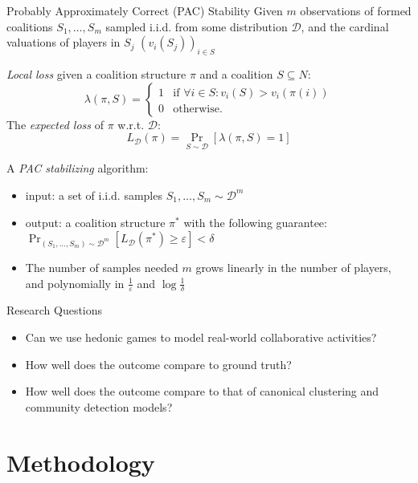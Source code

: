 \documentclass[xcolor=dvipsnames]{beamer}
\renewcommand{\cal}[1]{\mathcal{#1}}
\newcommand{\eps}{\varepsilon}
\begin{document}
\begin{frame}{Probably Approximately Correct (PAC) Stability}
  \small
  Given $m$ observations of formed coalitions $S_1,\dots,S_m$ sampled i.i.d. from some distribution $\cal D$, and the cardinal valuations of players in $S_j$ $(v_i(S_j))_{i \in S}$

  \textit{Local loss} given a coalition structure $\pi$ and a coalition $S \subseteq N$:
$$\lambda(\pi,S) = \begin{cases}1 & \mbox{if }\forall i \in S: v_i(S) > v_i(\pi(i))\\0&\mbox{otherwise.}\end{cases}$$
  The \textit{expected loss} of $\pi$ w.r.t. $\cal D$:
$$L_{\cal D}(\pi) = \Pr_{S \sim \cal D}\left[\lambda(\pi,S) =1\right]\label{eq:total-loss-D}$$

A \textit{PAC stabilizing} algorithm:
  \begin{itemize}
    \item input: a set of i.i.d. samples $S_1,\dots,S_m \sim \cal D^m$
    \item output: a coalition structure $\pi^*$  with the following guarantee:
    $\Pr_{(S_1,\dots,S_m)\sim \cal D^m}[L_{\cal D}(\pi^*) \ge \eps]< \delta \label{eq:pac-stable}$
    \item The number of samples needed $m$ grows linearly in the number of players, and polynomially in $\frac1\eps$ and $\log\frac1\delta$
  \end{itemize}


\end{frame}

\begin{frame}{Research Questions}
  \begin{itemize}
    \item Can we use hedonic games to model real-world collaborative activities?
    \item How well does the outcome compare to ground truth?
    \item How well does the outcome compare to that of canonical clustering and community detection models?
  \end{itemize}
\end{frame}

\section{Methodology}
\end{document}
